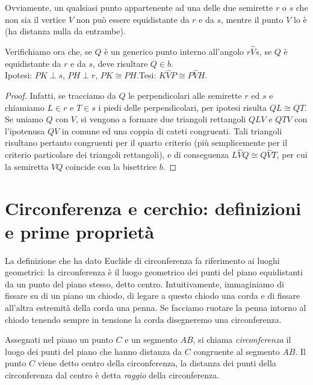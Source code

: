 Ovviamente, un qualsiasi punto appartenente ad una delle due semirette $r$ o $s$ che non sia il vertice $V$ non può essere equidistante da $r$ e da $s$, mentre il punto $V$ lo è (ha distanza nulla da entrambe).

Verifichiamo ora che, se $Q$ è un generico punto interno all'angolo $r\widehat{V}s$, se $Q$ è equidistante da $r$ e da $s$, deve risultare $Q\in b$.
~\\

\noindent Ipotesi: $PK\perp s$, $PH\perp r$, $PK\cong PH$.\tab Tesi: $K\widehat{V}P\cong P\widehat{V}H$.

\begin{proof}
Infatti, se tracciamo da $Q$ le perpendicolari alle semirette $r$ ed $s$ e chiamiamo $L\in r$ e $T\in s$ i piedi delle perpendicolari, per ipotesi risulta $QL\cong QT$. Se uniamo $Q$ con $V$, si vengono a formare due triangoli rettangoli $QLV$ e $QTV$ con l'ipotenusa $QV$ in comune ed una coppia di cateti congruenti. Tali triangoli risultano pertanto congruenti per il quarto criterio (più semplicemente per il criterio particolare dei triangoli rettangoli), e di conseguenza $L\widehat{V}Q\cong Q\widehat{V}T$, per cui la semiretta $VQ$ coincide con la bisettrice $b$.
\end{proof}


\section{Circonferenza e cerchio: definizioni e prime proprietà}

La definizione che ha dato Euclide di circonferenza fa riferimento ai luoghi geometrici: la circonferenza è il luogo geometrico dei punti del piano equidistanti da un punto del piano stesso, detto centro.
Intuitivamente, immaginiamo di fissare su di un piano un chiodo, di legare a questo chiodo una corda e di fissare all'altra estremità della corda una penna. Se facciamo ruotare la penna intorno al chiodo tenendo sempre in tensione la corda disegneremo una circonferenza.

\begin{definizione}
Assegnati nel piano un punto $C$ e un segmento $AB$, si chiama \emph{circonferenza} il luogo dei punti del piano che hanno distanza da $C$ congruente al segmento $AB$. Il punto $C$ viene detto centro della circonferenza, la distanza dei punti della circonferenza dal centro è detta \emph{raggio} della circonferenza.
\end{definizione}

